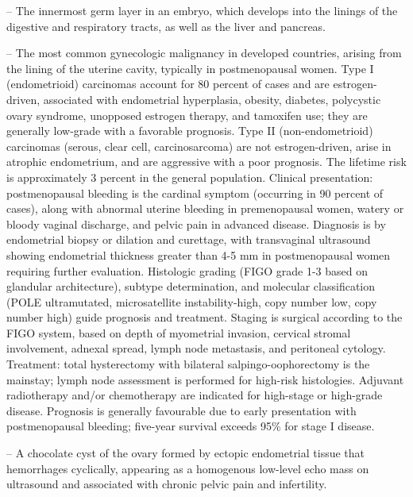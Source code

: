 -- The innermost germ layer in an embryo, which develops into the linings of the digestive and respiratory tracts, as well as the liver and pancreas.

-- The most common gynecologic malignancy in developed countries, arising from the lining of the uterine cavity, typically in postmenopausal women. Type I (endometrioid) carcinomas account for 80 percent of cases and are estrogen-driven, associated with endometrial hyperplasia, obesity, diabetes, polycystic ovary syndrome, unopposed estrogen therapy, and tamoxifen use; they are generally low-grade with a favorable prognosis. Type II (non-endometrioid) carcinomas (serous, clear cell, carcinosarcoma) are not estrogen-driven, arise in atrophic endometrium, and are aggressive with a poor prognosis. The lifetime risk is approximately 3 percent in the general population. Clinical presentation: postmenopausal bleeding is the cardinal symptom (occurring in 90 percent of cases), along with abnormal uterine bleeding in premenopausal women, watery or bloody vaginal discharge, and pelvic pain in advanced disease. Diagnosis is by endometrial biopsy or dilation and curettage, with transvaginal ultrasound showing endometrial thickness greater than 4-5 mm in postmenopausal women requiring further evaluation. Histologic grading (FIGO grade 1-3 based on glandular architecture), subtype determination, and molecular classification (POLE ultramutated, microsatellite instability-high, copy number low, copy number high) guide prognosis and treatment. Staging is surgical according to the FIGO system, based on depth of myometrial invasion, cervical stromal involvement, adnexal spread, lymph node metastasis, and peritoneal cytology. Treatment: total hysterectomy with bilateral salpingo-oophorectomy is the mainstay; lymph node assessment is performed for high-risk histologies. Adjuvant radiotherapy and/or chemotherapy are indicated for high-stage or high-grade disease. Prognosis is generally favourable due to early presentation with postmenopausal bleeding; five-year survival exceeds 95\% for stage I disease.

-- A chocolate cyst of the ovary formed by ectopic endometrial tissue that hemorrhages cyclically, appearing as a homogenous low-level echo mass on ultrasound and associated with chronic pelvic pain and infertility.

